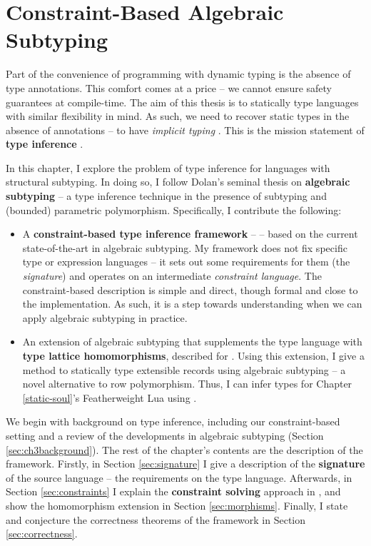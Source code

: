 \newenvironment{example}{%
\begin{tcolorbox}[%
    colback=blue!5!white,%
    colframe=blue!60!black,%
    title=\textsc{Example}%
]%
}{%
\end{tcolorbox}%
}

\chapter{Constraint-Based Algebraic Subtyping}
\label{algebraic-subtyping}

Part of the convenience of programming with dynamic typing is the absence of type annotations. 
This comfort comes at a price -- we cannot ensure safety guarantees at compile-time. 
The aim of this thesis is to statically type languages with similar flexibility in mind. As such, we need to recover static types in the absence of annotations -- to have \emph{implicit typing} \cite{remy-record-inference}. This is the mission statement of \textbf{type inference} \cite{tapl}.

In this chapter, I explore the problem of type inference for languages with structural subtyping. In doing so, I follow Dolan's seminal thesis on \textbf{algebraic subtyping} -- a type inference technique in the presence of subtyping and (bounded) parametric polymorphism. Specifically, I contribute the following:
\begin{itemize}
    \item A \textbf{constraint-based type inference framework} -- \inference{} -- based on the current state-of-the-art in algebraic subtyping. My framework does not fix specific type or expression languages -- it sets out some requirements for them (the \textit{signature}) and operates on an intermediate \emph{constraint language}. The constraint-based description is simple and direct, though formal and close to the implementation. As such, it is a step towards understanding when we can apply algebraic subtyping in practice.
    \item An extension of algebraic subtyping that supplements the type language with \textbf{type lattice homomorphisms}, described for \inference{}. Using this extension, I give a method to statically type extensible records using algebraic subtyping -- a novel alternative to row polymorphism. Thus, I can infer types for Chapter \ref{static-soul}'s Featherweight Lua using \inference{}.
\end{itemize}

We begin with background on type inference, including our constraint-based setting and a review of the developments in algebraic subtyping (Section \ref{sec:ch3background}). The rest of the chapter's contents are the description of the framework. Firstly, in Section \ref{sec:signature} I give a description of the \textbf{signature} of the source language -- the requirements on the type language. Afterwards, in Section \ref{sec:constraints} I explain the \textbf{constraint solving} approach in \inference{}, and show the homomorphism extension in Section \ref{sec:morphisms}. Finally, I state and conjecture the correctness theorems of the framework in Section \ref{sec:correctness}. 

